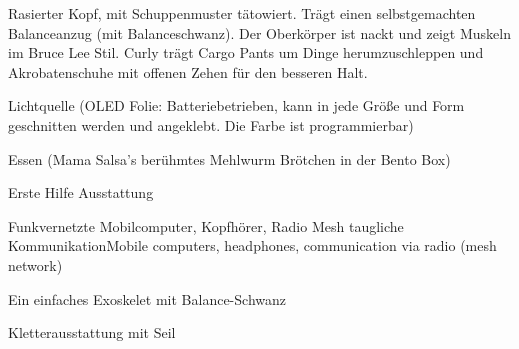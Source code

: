 \begin{npcBox}[title=Curly]
    \begin{stressSection}
    \end{stressSection}
    \begin{tabularx}{\textwidth}{ XX }
    \end{tabularx}

    \begin{consequences}
    \item {}
    \item {}
    \item {}
    \end{consequences}

    \begin{npcDescription}
    Rasierter Kopf, mit Schuppenmuster tätowiert. Trägt einen selbstgemachten Balanceanzug (mit Balanceschwanz).
    Der Oberkörper ist nackt und zeigt Muskeln im Bruce Lee Stil. Curly trägt Cargo Pants um Dinge herumzuschleppen und Akrobatenschuhe mit offenen Zehen für den besseren Halt.
    \end{npcDescription}


    \begin{equipment}
    \item Lichtquelle (OLED Folie: Batteriebetrieben, kann in jede Größe und Form geschnitten werden und angeklebt. Die Farbe ist programmierbar)
    \item Essen (Mama Salsa's berühmtes Mehlwurm Brötchen in der Bento Box)
    \item Erste Hilfe Ausstattung
    \item Funkvernetzte Mobilcomputer, Kopfhörer, Radio Mesh taugliche KommunikationMobile computers, headphones, communication via radio (mesh network)
    \item Ein einfaches Exoskelet mit Balance-Schwanz
    \item Kletterausstattung mit Seil
    \end{equipment}
\end{npcBox}



